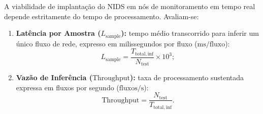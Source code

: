 A viabilidade de implantação do NIDS em nós de monitoramento em tempo real depende estritamente do tempo de processamento. Avaliam-se:
\begin{enumerate}
    \item \textbf{Latência por Amostra ($L_{\mathrm{sample}}$):} tempo médio transcorrido para inferir um único fluxo de rede, expresso em milissegundos por fluxo ($\mathrm{ms/fluxo}$):
    \begin{equation}
    L_{\mathrm{sample}} = \frac{T_{\mathrm{total,inf}}}{N_{\mathrm{test}}} \times 10^3;
    \end{equation}
    
    \item \textbf{Vazão de Inferência ($\mathrm{Throughput}$):} taxa de processamento sustentada expressa em fluxos por segundo ($\mathrm{fluxos/s}$):
    \begin{equation}
    \mathrm{Throughput} = \frac{N_{\mathrm{test}}}{T_{\mathrm{total,inf}}}.
    \end{equation}
\end{enumerate}
